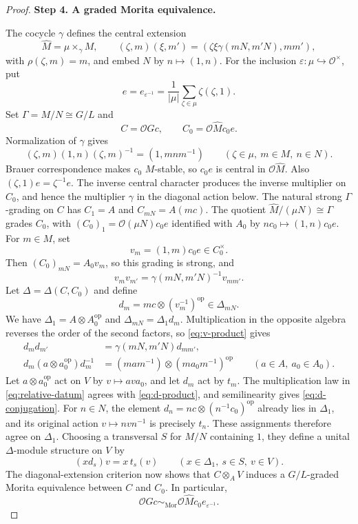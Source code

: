 \documentclass[11pt,a4paper]{article}
\theoremstyle{definition}
\theoremstyle{remark}
\numberwithin{equation}{section}
\newcommand{\cO}{\mathcal{O}}
\newcommand{\Mor}{\mathrm{Mor}}
\newcommand{\op}{\mathrm{op}}
\newcommand{\proofstep}[1]{%
	\par\addvspace{\medskipamount}%
	\noindent\textbf{#1}\par\nobreak
	\smallskip\nobreak\noindent\ignorespaces
}
\begin{document}
\begin{proof}
		\proofstep{Step 4. A graded Morita equivalence.}
		The cocycle $\gamma$ defines the central extension
		\[
		\widehat M=\mu\times_\gamma M,\qquad
		(\zeta,m)(\xi,m')=(\zeta\xi\gamma(mN,m'N),mm'),
		\]
		with $\rho(\zeta,m)=m$, and embed $N$ by $n\mapsto(1,n)$.
		For the inclusion $\varepsilon:\mu\hookrightarrow\cO^\times$, put
		\[
		e=e_{\varepsilon^{-1}}=\frac1{|\mu|}
		\sum_{\zeta\in\mu}\zeta(\zeta,1).
		\]
		Set $\Gamma=M/N\cong G/L$ and
		\[
		C=\cO Gc,\qquad
		C_0=\cO\widehat M c_0e.
		\]
		Normalization of $\gamma$ gives
		\[
		(\zeta,m)(1,n)(\zeta,m)^{-1}=(1,mnm^{-1})
		\qquad(\zeta\in\mu,\ m\in M,\ n\in N).
		\]
		Brauer correspondence makes $c_0$ $M$-stable, so $c_0e$ is
		central in $\cO\widehat M$. Also $(\zeta,1)e=\zeta^{-1}e$. The inverse central character
		produces the inverse multiplier on $C_0$, and hence the multiplier
		$\gamma$ in the diagonal action below.
		The natural strong $\Gamma$-grading on $C$ has $C_1=A$ and
		$C_{mN}=A(mc)$. The quotient $\widehat M/(\mu N)\cong\Gamma$
		grades $C_0$, with $(C_0)_1=\cO(\mu N)c_0e$ identified with $A_0$ by
		$nc_0\mapsto(1,n)c_0e$. For $m\in M$, set
		\[
		v_m=(1,m)c_0e\in C_0^\times.
		\]
		Then $(C_0)_{mN}=A_0v_m$, so this grading is strong, and
		\begin{equation}\label{eq:v-product}
			v_mv_{m'}=\gamma(mN,m'N)^{-1}v_{mm'}.
		\end{equation}
		Let $\Delta=\Delta(C,C_0)$ and define
		\[
		d_m=mc\otimes(v_m^{-1})^{\op}\in\Delta_{mN}.
		\]
		We have $\Delta_1=A\otimes A_0^{\op}$ and
		$\Delta_{mN}=\Delta_1d_m$. Multiplication in the opposite algebra
		reverses the order of the second factors, so \eqref{eq:v-product} gives
		\begin{align}
			d_md_{m'}&=\gamma(mN,m'N)d_{mm'},\label{eq:d-product}\\
			d_m(a\otimes a_0^{\op})d_m^{-1}
			&=(mam^{-1})\otimes(ma_0m^{-1})^{\op}
			\qquad(a\in A,\ a_0\in A_0).\label{eq:d-conjugation}
		\end{align}
		Let $a\otimes a_0^{\op}$ act on $V$ by $v\mapsto av a_0$, and let
		$d_m$ act by $t_m$. The multiplication law in
		\eqref{eq:relative-datum} agrees with \eqref{eq:d-product}, and
		semilinearity gives \eqref{eq:d-conjugation}. For $n\in N$, the
		element $d_n=nc\otimes(n^{-1}c_0)^{\op}$ already lies in
		$\Delta_1$, and its original action $v\mapsto nvn^{-1}$ is
		precisely $t_n$. These assignments therefore agree on $\Delta_1$.
		Choosing a transversal $S$ for $M/N$ containing $1$, they define
		a unital $\Delta$-module structure on $V$ by
		\[
		(xd_s)v=x\,t_s(v)\qquad(x\in\Delta_1,\ s\in S,\ v\in V).
		\]
		The diagonal-extension criterion now shows that $C\otimes_A V$
		induces a $G/L$-graded Morita equivalence between $C$ and $C_0$.
		In particular,
		\begin{equation}\label{eq:scalar-induction}
			\cO Gc\sim_{\Mor}\cO\widehat M c_0e_{\varepsilon^{-1}}.
		\end{equation}
		

\end{proof}
\end{document}
